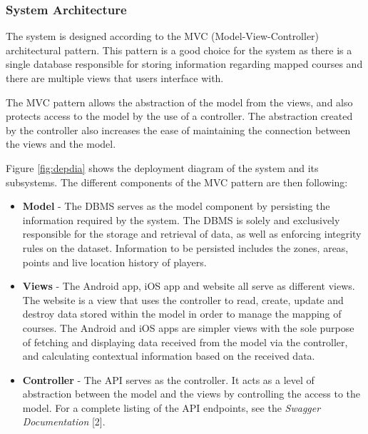 \documentclass{article}
\begin{document}
    \subsubsection{System Architecture}
    \label{sec:sysarch}
    
    The system is designed according to the MVC (Model-View-Controller)
    architectural pattern. This pattern is a good choice for the system as
    there is a single database responsible for storing information regarding
    mapped courses and there are multiple views that users interface with.
    
    The MVC pattern allows the abstraction of the model from the views, and
    also protects access to the model by the use of a controller. The
    abstraction created by the controller also increases the ease of
    maintaining the connection between the views and the model.

    Figure \ref{fig:depdia} shows the deployment diagram of the system and its
    subsystems. The different components of the MVC pattern are then following:

    \begin{itemize}
        \item \textbf{Model} - The DBMS serves as the model component by
            persisting the information required by the system. The DBMS is
            solely and exclusively responsible for the storage and retrieval of
            data, as well as enforcing integrity rules on the dataset.
            Information to be persisted includes the zones, areas, points and
            live location history of players.
        \item \textbf{Views} - The Android app, iOS app and website all serve
            as different views. The website is a view that uses the controller
            to read, create, update and destroy data stored within the model in
            order to manage the mapping of courses. The Android and iOS apps
            are simpler views with the sole purpose of fetching and displaying
            data received from the model via the controller, and calculating
            contextual information based on the received data.
        \item \textbf{Controller} - The API serves as the controller. It acts
            as a level of abstraction between the model and the views by
            controlling the access to the model. For a complete listing of the
            API endpoints, see the \textit{Swagger Documentation} [2].
    \end{itemize}
\end{document}
